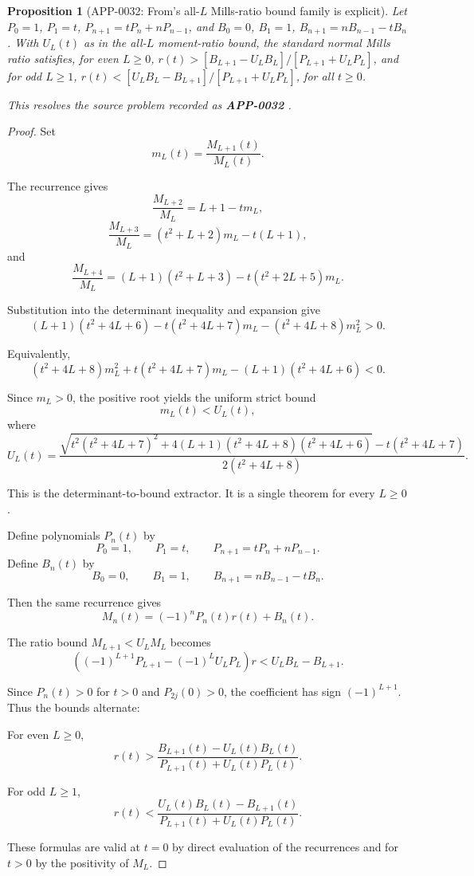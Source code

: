 \documentclass[11pt]{article}
\numberwithin{equation}{section}
\newtheorem{proposition}[theorem]{Proposition}
\theoremstyle{definition}
\theoremstyle{remark}
\newcommand{\1}{\mathbf 1}
\begin{document}
\begin{proposition}[APP-0032: From's all-\(L\) Mills-ratio bound family is explicit]
\label{res:from-mills-all-l-alternating-r-bound-family}
Let \(P_0=1\), \(P_1=t\), \(P_{n+1}=tP_n+nP_{n-1}\), and \(B_0=0\), \(B_1=1\), \(B_{n+1}=nB_{n-1}-tB_n\). With \(U_L(t)\) as in the all-\(L\) moment-ratio bound, the standard normal Mills ratio satisfies, for even \(L\ge0\), \(r(t)>[B_{L+1}-U_LB_L]/[P_{L+1}+U_LP_L]\), and for odd \(L\ge1\), \(r(t)<[U_LB_L-B_{L+1}]/[P_{L+1}+U_LP_L]\), for all \(t\ge0\).

This resolves the source problem recorded as \textbf{APP-0032} \cite{from-mills}.
\end{proposition}

\begin{proof}
Set
\[
m_L(t)=\frac{M_{L+1}(t)}{M_L(t)}.
\]

The recurrence gives
\[
\frac{M_{L+2}}{M_L}=L+1-tm_L,
\]
\[
\frac{M_{L+3}}{M_L}=(t^2+L+2)m_L-t(L+1),
\]
and
\[
\frac{M_{L+4}}{M_L}=(L+1)(t^2+L+3)-t(t^2+2L+5)m_L.
\]

Substitution into the determinant inequality and expansion give
\[
(L+1)(t^2+4L+6)-t(t^2+4L+7)m_L-(t^2+4L+8)m_L^2>0.
\]

Equivalently,
\[
(t^2+4L+8)m_L^2+t(t^2+4L+7)m_L-(L+1)(t^2+4L+6)<0.
\]

Since \(m_L>0\), the positive root yields the uniform strict bound
\[
m_L(t)<U_L(t),
\]
where
\[
U_L(t)=
\frac{
\sqrt{t^2(t^2+4L+7)^2+4(L+1)(t^2+4L+8)(t^2+4L+6)}
-t(t^2+4L+7)
}
{2(t^2+4L+8)}.
\]

This is the determinant-to-bound extractor. It is a single theorem for every \(L\ge0\).

Define polynomials \(P_n(t)\) by
\[
P_0=1,\qquad P_1=t,\qquad P_{n+1}=tP_n+nP_{n-1}.
\]
Define \(B_n(t)\) by
\[
B_0=0,\qquad B_1=1,\qquad B_{n+1}=nB_{n-1}-tB_n.
\]

Then the same recurrence gives
\[
M_n(t)=(-1)^nP_n(t)r(t)+B_n(t).
\]

The ratio bound \(M_{L+1}<U_LM_L\) becomes
\[
\left((-1)^{L+1}P_{L+1}-(-1)^L U_LP_L\right)r
<U_LB_L-B_{L+1}.
\]

Since \(P_n(t)>0\) for \(t>0\) and \(P_{2j}(0)>0\), the coefficient has sign \((-1)^{L+1}\). Thus the bounds alternate:

For even \(L\ge0\),
\[
r(t)>
\frac{B_{L+1}(t)-U_L(t)B_L(t)}
{P_{L+1}(t)+U_L(t)P_L(t)}.
\]

For odd \(L\ge1\),
\[
r(t)<
\frac{U_L(t)B_L(t)-B_{L+1}(t)}
{P_{L+1}(t)+U_L(t)P_L(t)}.
\]

These formulas are valid at \(t=0\) by direct evaluation of the recurrences and for \(t>0\) by the positivity of \(M_L\).
\end{proof}
\end{document}
